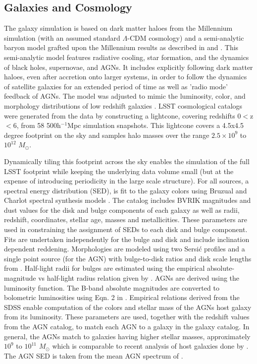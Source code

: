 \documentclass[]{article}
\begin{document}
\subsection{Galaxies and Cosmology \label{sec:gal}}

The galaxy simulation is based on dark matter haloes from the
Millennium simulation \citep{springel05} (with an assumed standard
$\Lambda$-CDM cosmology) and a semi-analytic baryon model grafted upon
the Millennium results as described in \citet{springel05} and
\citet{delucia}. This semi-analytic model features radiative cooling,
star formation, and the dynamics of black holes, supernovae, and
AGNs. It includes explicitly following dark matter haloes, even after
accretion onto larger systems, in order to follow the dynamics of
satellite galaxies for an extended period of time as well as 'radio
mode' feedback of AGNs. The model was adjusted to mimic the
luminosity, color, and morphology distributions of low redshift
galaxies \citep{delucia}. LSST cosmological catalogs were generated
from the \citet{delucia} data by constructing a lightcone, covering
redshifts 0$<$z$<$6, from 58 500h$^{-1}$Mpc simulation snapshots. This
lightcone covers a 4.5x4.5 degree footprint on the sky and samples
halo masses over the range $2.5\times10^9$ to $10^{12}$ $M_\odot$.

Dynamically tiling this footprint across the sky enables the
simulation of the full LSST footprint while keeping the underlying
data volume small (but at the expense of introducing periodicity in
the large scale structure).  For all sources, a spectral energy
distribution (SED), is fit to the galaxy colors using Bruzual and
Charlot spectral synthesis models \citep{bruzual}. The \citet{delucia}
catalog includes BVRIK magnitudes and dust values for the disk and
bulge components of each galaxy as well as radii, redshift,
coordinates, stellar age, masses and metallicities. These parameters
are used in constraining the assignment of SEDs to each disk and bulge
component.  Fits are undertaken independently for the bulge and disk
and include inclination dependent reddening. Morphologies are modeled
using two Sersi{\'c} profiles and a single point source (for the AGN)
with bulge-to-disk ratios and disk scale lengths from \citet{delucia}.
Half-light radii for bulges are estimated using the empirical
absolute-magnitude vs half-light radius relation given by
\citet{gonzalez09}.  AGNs are derived using the \citet{bongiorno12}
luminosity function. The B-band absolute magnitudes are converted to
bolometric luminosities using Eqn. 2 in \citet{hopkins07}. Empirical
relations derived from the SDSS enable computation of the colors and
stellar mass of the AGNs host galaxy from its luminosity. These
parameters are used, together with the redshift values from the AGN
catalog, to match each AGN to a galaxy in the galaxy catalog. In
general, the AGNs match to galaxies having higher stellar masses,
approximately $10^{9}$ to $10^{11}$ $M_{\odot}$ which is comparable to
recent analysis of host galaxies done by \citet{xue11}. The AGN SED is
taken from the mean AGN spectrum of \citet{vandenberk}.
\end{document}
